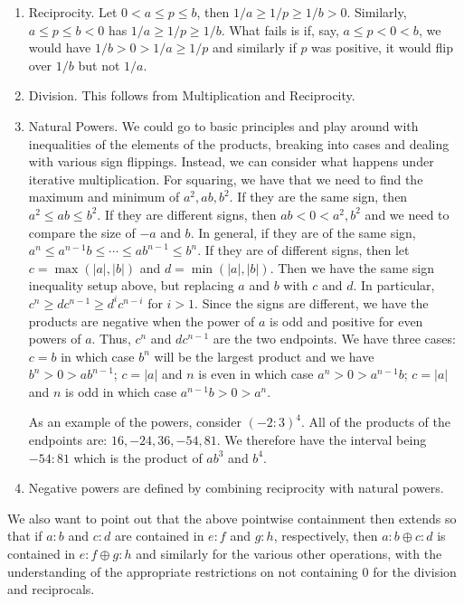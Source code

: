 \documentclass[12pt]{article}
\theoremstyle{remark}
\begin{document}
\begin{enumerate}
    \item Reciprocity. Let $0 < a \leq p \leq b$, then $1/a \geq 1/p  \geq 1/b > 0$. Similarly, $a \leq p \leq b< 0$ has $1/a \geq 1/p \geq 1/b$. What fails is if, say,  $a \leq p < 0 < b$, we would have $1/b > 0 > 1/a \geq 1/p $ and similarly if $p$ was positive, it would flip over $1/b$ but not $1/a$.
    \item Division. This follows from Multiplication and Reciprocity. 
    \item\label{natpow} Natural Powers. We could go to basic principles and play around with inequalities of the elements of the products, breaking into cases and dealing with various sign flippings. Instead, we can consider what happens under iterative multiplication. For squaring, we have that we need to find the maximum and minimum of $a^2, ab, b^2$. If they are the same sign, then $a^2 \leq ab \leq b^2$. If they are different signs, then $ab < 0 < a^2, b^2$ and we need to compare the size of $-a$ and $b$.  In general, if they are of the same sign, $a^n \leq a^{n-1} b \leq \cdots \leq ab^{n-1} \leq b^n$. If they are of different signs, then let $c = \max( |a|, |b|)$ and $d=\min(|a|, |b|)$. Then we have the same sign inequality setup above, but replacing $a$ and $b$ with $c$ and $d$. In particular,  $c^n \geq d c^{n-1} \geq d^{i}c^{n-i}$  for $i > 1$.  Since the signs are different, we have the products are negative when the power of $a$ is odd and positive for even powers of $a$. Thus, $c^n$ and $d c^{n-1}$ are the two endpoints. We have three cases: $c=b$ in which case $b^n$ will be the largest product and we have $b^n > 0 > ab^{n-1}$; $c=|a|$ and $n$ is even in which case $a^n > 0 > a^{n-1} b$; $c=|a|$ and $n$ is odd in which case $a^{n-1} b > 0 > a^n$.  

As an example of the powers, consider $(-2:3)^4$. All of the products of the endpoints are: $16, -24, 36, -54, 81$. We therefore have the interval being $-54:81$ which is the product of $ab^3$ and $b^4$. 

    
     
    \item Negative powers are defined by combining reciprocity with natural powers. 
\end{enumerate}


We also want to point out that the above pointwise containment then extends so that if $a:b$ and $c:d$ are contained in $e:f$ and $g:h$, respectively, then $a:b \oplus c:d $ is contained in $e:f \oplus g:h$ and similarly for the various other operations, with the understanding of the appropriate restrictions on not containing 0 for the division and reciprocals. 
\end{document}
